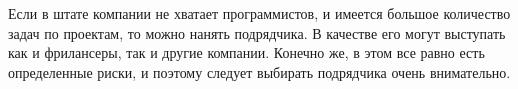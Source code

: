 \documentclass{../industrial-development}
\begin{document}
\lecturenotes
Если в штате компании не хватает программистов, и имеется большое количество задач по проектам, то можно нанять подрядчика. В качестве его могут выступать как и фрилансеры, так и другие компании. Конечно же, в этом все равно есть определенные риски, и поэтому следует выбирать подрядчика очень внимательно. 

\begin{thebibliography}{99}
\end{thebibliography}
\end{document}
